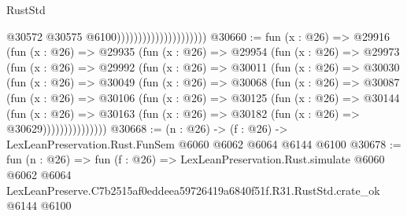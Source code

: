 \begin{lexlean}{RustStd}
\begin{coremodule}
                                              @30572
                                              @30575
                                              @6100)))))))))))))))))))))
@30660 := fun (x : @26) =>
  @29916
    (fun (x : @26) =>
    @29935
      (fun (x : @26) =>
      @29954
        (fun (x : @26) =>
        @29973
          (fun (x : @26) =>
          @29992
            (fun (x : @26) =>
            @30011
              (fun (x : @26) =>
              @30030
                (fun (x : @26) =>
                @30049
                  (fun (x : @26) =>
                  @30068
                    (fun (x : @26) =>
                    @30087
                      (fun (x : @26) =>
                      @30106
                        (fun (x : @26) =>
                        @30125
                          (fun (x : @26) =>
                          @30144
                            (fun (x : @26) =>
                            @30163 (fun (x : @26) => @30182 (fun (x : @26) => @30629)))))))))))))))
@30668 := (n : @26) -> (f : @26) -> LexLeanPreservation.Rust.FunSem @6060 @6062 @6064 @6144 @6100
@30678 := fun (n : @26) =>
  fun (f : @26) =>
  LexLeanPreservation.Rust.simulate
    @6060
    @6062
    @6064
    LexLeanPreserve.C7b2515af0eddeea59726419a6840f51f.R31.RustStd.crate_ok
    @6144
    @6100
\end{coremodule}
\end{lexlean}
